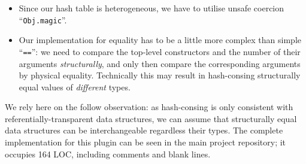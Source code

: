 \begin{itemize}
\item Since our hash table is heterogeneous, we have to utilise unsafe coercion ``\lstinline{Obj.magic}''.
\item Our implementation for equality has to be a little more complex than simple ``\lstinline{==}'': we need to compare the top-level constructors and
  the number of their arguments \emph{structurally}, and only then compare the corresponding arguments by physical equality. Technically this
  may result in hash-consing structurally equal values of \emph{different} types.
\end{itemize}

We rely here on the follow observation: as hash-consing is only consistent with referentially-transparent data structures, we can assume
that structurally equal data structures can be interchangeable regardless their types. The complete implementation for this plugin can be seen in the main project
repository; it occupies 164 LOC, including comments and blank lines.
